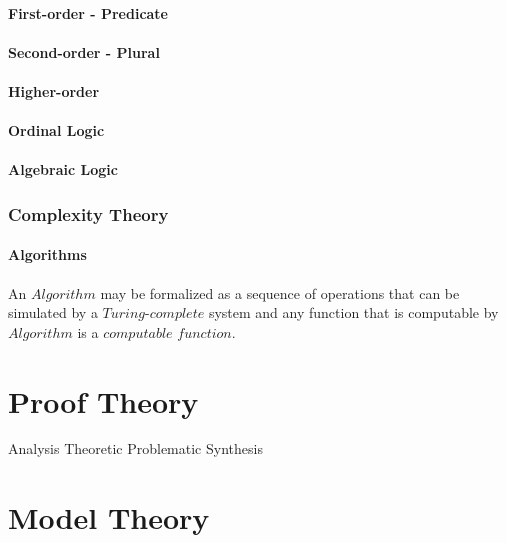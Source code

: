 \documentclass{article}
\begin{document}
\subsection{First-order - Predicate}

\subsection{Second-order - Plural}

\subsection{Higher-order}

\subsection{Ordinal Logic}

\subsection{Algebraic Logic}


\section{Complexity Theory}

\subsection{Algorithms}

An $Algorithm$ may be formalized as a sequence of operations that
can be simulated by a $Turing$-$complete$ system and any function
that is computable by $Algorithm$ is a $computable$ $function$.

\part{Proof Theory}

Analysis
    Theoretic
    Problematic
Synthesis


\part{Model Theory}
\end{document}
